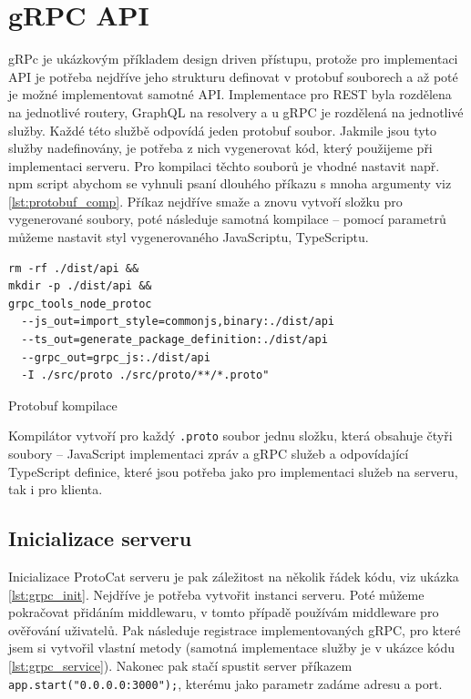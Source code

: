 \documentclass[thesis=M,czech]{FITthesis}[2019/12/23]
\begin{document}
\section{gRPC API}
gRPc je ukázkovým příkladem design driven přístupu, protože pro implementaci API je potřeba nejdříve jeho strukturu definovat v protobuf souborech a až poté je možné implementovat samotné API. Implementace pro REST byla rozdělena na jednotlivé routery, GraphQL na resolvery a u gRPC je rozdělená na jednotlivé služby. Každé této službě odpovídá jeden protobuf soubor. Jakmile jsou tyto služby nadefinovány, je potřeba z nich vygenerovat kód, který použijeme při implementaci serveru. Pro kompilaci těchto souborů je vhodné nastavit např. npm script abychom se vyhnuli psaní dlouhého příkazu s mnoha argumenty viz \ref{lst:protobuf_comp}. Příkaz nejdříve smaže a znovu vytvoří složku pro vygenerované soubory, poté následuje samotná kompilace -- pomocí parametrů můžeme nastavit styl vygenerovaného JavaScriptu, TypeScriptu.

\begin{listing}[H]
\begin{verbatim}
rm -rf ./dist/api &&
mkdir -p ./dist/api &&
grpc_tools_node_protoc 
  --js_out=import_style=commonjs,binary:./dist/api
  --ts_out=generate_package_definition:./dist/api
  --grpc_out=grpc_js:./dist/api
  -I ./src/proto ./src/proto/**/*.proto"
\end{verbatim}
\caption{Protobuf kompilace}
\label{lst:protobuf_comp}
\end{listing}


Kompilátor vytvoří pro každý \texttt{.proto} soubor jednu složku, která obsahuje čtyři soubory -- JavaScript implementaci zpráv a gRPC služeb a odpovídající TypeScript definice, které jsou potřeba jako pro implementaci služeb na serveru, tak i pro klienta.


\subsection{Inicializace serveru}
Inicializace ProtoCat serveru je pak záležitost na několik řádek kódu, viz ukázka \ref{lst:grpc_init}. Nejdříve je potřeba vytvořit instanci serveru. 
Poté můžeme pokračovat přidáním middlewaru, v tomto případě používám middleware pro ověřování uživatelů. Pak následuje registrace implementovaných gRPC, pro které jsem si vytvořil vlastní metody (samotná implementace služby je v ukázce kódu \ref{lst:grpc_service}). Nakonec pak stačí spustit server příkazem \texttt{app.start("0.0.0.0:3000");}, kterému jako parametr zadáme adresu a port.
\end{document}
